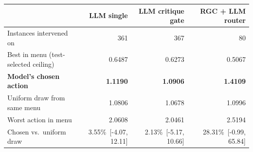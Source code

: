 \begin{tabular}{lrrr}
\toprule
 & LLM single & LLM critique gate & RGC + LLM router \\
\midrule
Instances intervened on & 361 & 367 & 80 \\
Best in menu (test-selected ceiling) & 0.6487 & 0.6273 & 0.5067 \\
\textbf{Model's chosen action} & \textbf{1.1190} & \textbf{1.0906} & \textbf{1.4109} \\
Uniform draw from same menu & 1.0806 & 1.0678 & 1.0996 \\
Worst action in menu & 2.0608 & 2.0461 & 2.5194 \\
\midrule Chosen vs.\ uniform draw & 3.55\%~[-4.07, 12.11] & 2.13\%~[-5.17, 10.66] & 28.31\%~[-0.99, 65.84] \\
\bottomrule
\end{tabular}
